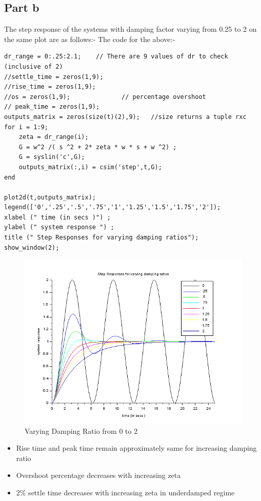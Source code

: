 \documentclass[12pt]{article}
\begin{document}
\subsection*{Part b}     
 The step response of the systems with damping factor varying from 0.25 to 2 on the same plot are as follows:-
 The code for the above:-
    \begin{verbatim}
dr_range = 0:.25:2.1;    // There are 9 values of dr to check (inclusive of 2)
//settle_time = zeros(1,9);
//rise_time = zeros(1,9);
//os = zeros(1,9);              // percentage overshoot
// peak_time = zeros(1,9);
outputs_matrix = zeros(size(t)(2),9);   //size returns a tuple rxc
for i = 1:9;
    zeta = dr_range(i);
    G = w^2 /( s ^2 + 2* zeta * w * s + w ^2) ;
    G = syslin('c',G);
    outputs_matrix(:,i) = csim('step',t,G);
end

plot2d(t,outputs_matrix);
legend(['0','.25','.5','.75','1','1.25','1.5','1.75','2']);
xlabel (" time (in secs )") ;
ylabel (" system response ") ;
title (" Step Responses for varying damping ratios");
show_window(2);
    \end{verbatim}
    \begin{figure}[H]
        \centering
        \includegraphics[scale=0.8]{q2_b.png}
        \caption{Varying Damping Ratio from 0 to 2}
        \label{fig:my_label}
    \end{figure}  
\begin{itemize}
\item Rise time and peak time remain approximately same for increasing damping ratio
\item Overshoot percentage decreases with increasing zeta
\item 2\% settle time decreases with increasing zeta in underdamped regime
\end{itemize}
\end{document}
